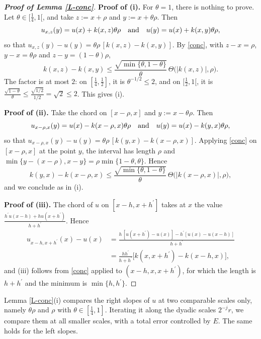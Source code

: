 \documentclass[reqno,12pt]{amsart}
\numberwithin{equation}{section}
\theoremstyle{remark}
\begin{document}
\begin{proof}[\bf Proof of Lemma \ref{L-conc}]
\medskip

{\bf Proof of (i).} For $\theta=1$, there is nothing to prove. Let $\theta\in[\frac14,1[$, and take $z:=x+\rho$ and $y:=x+\theta\rho$. Then
\begin{equation*}
u_{x,z}(y)=u(x)+k(x,z)\theta\rho\quad\hbox{and}\quad u(y)=u(x)+k(x,y)\theta\rho,
\end{equation*}
so that $u_{x,z}(y)-u(y)=\theta\rho\,[k(x,z)-k(x,y)]$. By \eqref{conc}, with $z-x=\rho$, $y-x=\theta\rho$ and $z-y=(1-\theta)\rho$,
\begin{equation*}
k(x,z)-k(x,y)\leq\frac{\sqrt{\min\{\theta,1-\theta\}}}{\theta}\,\Theta\big(|k(x,z)|,\rho\big).
\end{equation*}
The factor is at most $2$: on $[\frac14,\frac12]$, it is $\theta^{-1/2}\leq2$, and on $[\frac12,1[$, it is $\frac{\sqrt{1-\theta}}\theta\leq\frac{\sqrt{1/2}}{1/2}=\sqrt2\leq2$. This gives (i).

\medskip

{\bf Proof of (ii).} Take the chord on $[x-\rho,x]$ and $y:=x-\theta\rho$. Then
\begin{equation*}
u_{x-\rho,x}(y)=u(x)-k(x-\rho,x)\theta\rho\quad\hbox{and}\quad u(y)=u(x)-k(y,x)\theta\rho,
\end{equation*}
so that $u_{x-\rho,x}(y)-u(y)=\theta\rho\,[k(y,x)-k(x-\rho,x)]$. Applying \eqref{conc} on $[x-\rho,x]$ at the point $y$, the interval has length $\rho$ and $\min\{y-(x-\rho),x-y\}=\rho\min\{1-\theta,\theta\}$. Hence
\begin{equation*}
k(y,x)-k(x-\rho,x)\leq\frac{\sqrt{\min\{\theta,1-\theta\}}}{\theta}\,\Theta\big(|k(x-\rho,x)|,\rho\big),
\end{equation*}
and we conclude as in (i).

\medskip

{\bf Proof of (iii).} The chord of $u$ on $[x-h,x+h^\prime]$ takes at $x$ the value $\frac{h^\prime u(x-h)+hu(x+h^\prime)}{h+h^\prime}$. Hence
\begin{align*}
u_{x-h,x+h^\prime}(x)-u(x)&=\frac{h\,[u(x+h^\prime)-u(x)]-h^\prime[u(x)-u(x-h)]}{h+h^\prime}\\
&=\frac{hh^\prime}{h+h^\prime}\big[k(x,x+h^\prime)-k(x-h,x)\big],
\end{align*}
and (iii) follows from \eqref{conc} applied to $(x-h,x,x+h^\prime)$, for which the length is $h+h^\prime$ and the minimum is $\min\{h,h^\prime\}$.
\end{proof}

Lemma \ref{L-conc}(i) compares the right slopes of $u$ at two comparable scales only, namely $\theta\rho$ and $\rho$ with $\theta\in[\frac14,1]$. Iterating it along the dyadic scales $2^{-j}r$, we compare them at all smaller scales, with a total error controlled by $E$. The same holds for the left slopes.
\end{document}

